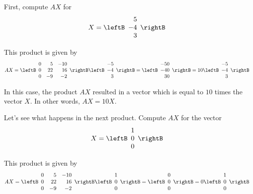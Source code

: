 \begin{solution}
First, compute $AX$ for 
\begin{equation*}
X =\leftB
\begin{array}{r}
5 \\
-4 \\
3
\end{array}
\rightB
\end{equation*}

This product is given by 
\begin{equation*}
AX = \leftB
\begin{array}{rrr}
0 & 5 & -10 \\
0 & 22 & 16 \\
0 & -9 & -2
\end{array}
\rightB \leftB
\begin{array}{r}
-5 \\
-4 \\
3
\end{array}
\rightB = \leftB
\begin{array}{r}
-50 \\
-40 \\
30
\end{array}
\rightB =10\leftB
\begin{array}{r}
-5 \\
-4 \\
3
\end{array}
\rightB 
\end{equation*}

In this case, the product $AX$ resulted in a vector which is equal to $10$ times the vector $X$. 
In other words, $AX=10X$.

Let's see what happens in the next product.
Compute $AX$ for the vector 
\begin{equation*}
X =  \leftB
\begin{array}{r}
1 \\
0 \\
0
\end{array}
\rightB 
\end{equation*}

This product is given by 
\begin{equation*}
AX = \leftB
\begin{array}{rrr}
0 & 5 & -10 \\
0 & 22 & 16 \\
0 & -9 & -2
\end{array}
\rightB \leftB
\begin{array}{r}
1 \\
0 \\
0
\end{array}
\rightB = \leftB
\begin{array}{r}
0 \\
0 \\
0
\end{array}
\rightB =0\leftB
\begin{array}{r}
1 \\
0 \\
0
\end{array}
\rightB 
\end{equation*}


\end{solution}
